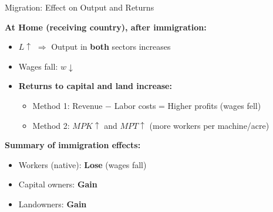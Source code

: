 \begin{frame}{Migration: Effect on Output and Returns}

\textbf{At Home (receiving country), after immigration:}

\vspace{0.3cm}

\begin{itemize}
    \item $L \uparrow$ $\Rightarrow$ Output in \textbf{both} sectors increases
    
    \vspace{0.2cm}
    
    \item Wages fall: $w \downarrow$
    
    \vspace{0.2cm}
    
    \item \textbf{Returns to capital and land increase:}
    \begin{itemize}
        \item Method 1: Revenue $-$ Labor costs = Higher profits (wages fell)
        \item Method 2: $MPK \uparrow$ and $MPT \uparrow$ (more workers per machine/acre)
    \end{itemize}
\end{itemize}

\vspace{0.5cm}

\textbf{Summary of immigration effects:}
\begin{itemize}
    \item \textcolor{laborcolor}{Workers (native):} \textbf{Lose} (wages fall)
    \item \textcolor{capitalcolor}{Capital owners:} \textbf{Gain}
    \item \textcolor{landcolor}{Landowners:} \textbf{Gain}
\end{itemize}

\end{frame}


